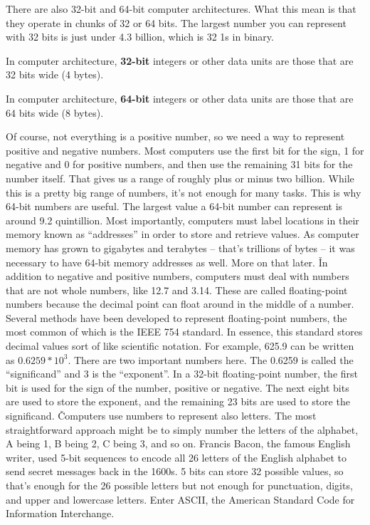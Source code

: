 There are also 32-bit and 64-bit computer architectures. What this mean is that they operate in chunks of 32 or 64
bits. The largest number you can represent with 32 bits is just under 4.3 billion, which is 32 1s in binary.

\bd[32-bit]
In computer architecture, \textbf{32-bit} integers or other data units are those that are 32 bits wide (4 bytes).
\ed

\bd[64-bit]
In computer architecture, \textbf{64-bit} integers or other data units are those that are 64 bits wide (8 bytes).
\ed

Of course, not everything is a positive number, so we need a way to represent positive and negative numbers. Most
computers use the first bit for the sign, 1 for negative and 0 for positive numbers, and then use the remaining 31
bits for the number itself. That gives us a range of roughly plus or minus two billion. While this is a pretty big
range of numbers, it's not enough for many tasks. This is why 64-bit numbers are useful. The largest value a 64-bit
number can represent is around 9.2 quintillion. Most importantly, computers must label locations in their memory
known as ``addresses'' in order to store and retrieve values. As computer memory has grown to gigabytes and terabytes
– that's trillions of bytes – it was necessary to have 64-bit memory addresses as well. More on that later. \v

In addition to negative and positive numbers, computers must deal with numbers that are not whole numbers, like 12.7
and 3.14. These are called floating-point numbers because the decimal point can float around in the middle of a
number. Several methods have been developed to represent floating-point numbers, the most common of which is the IEEE
754 standard. In essence, this standard stores decimal values sort of like scientific notation. For example, 625.9
can be written as $0.6259 * 10^3$. There are two important numbers here. The 0.6259 is called the ``significand'' and
3 is the ``exponent''. In a 32-bit floating-point number, the first bit is used for the sign of the number, positive
or negative. The next eight bits are used to store the exponent, and the remaining 23 bits are used to store the
significand. \v

Computers use numbers to represent also letters. The most straightforward approach might be to simply number the
letters of the alphabet, A being 1, B being 2, C being 3, and so on. Francis Bacon, the famous English writer, used
5-bit sequences to encode all 26 letters of the English alphabet to send secret messages back in the 1600s. 5 bits
can store 32 possible values, so that's enough for the 26 possible letters but not enough for punctuation, digits,
and upper and lowercase letters. Enter ASCII, the American Standard Code for Information Interchange.

